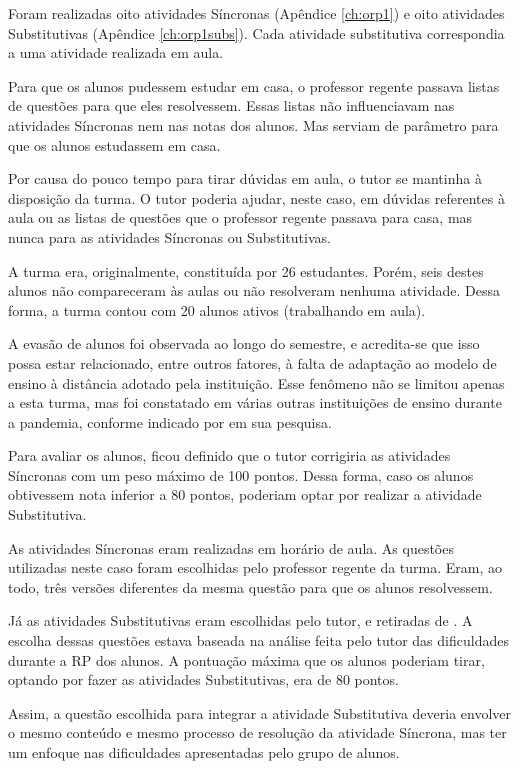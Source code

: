 Foram realizadas oito atividades Síncronas (Apêndice \ref{ch:orp1}) e oito atividades Substitutivas (Apêndice \ref{ch:orp1subs}). Cada atividade substitutiva correspondia a uma atividade realizada em aula.

Para que os alunos pudessem estudar em casa, o professor regente passava listas de questões para que eles resolvessem. Essas listas não influenciavam nas atividades Síncronas nem nas notas dos alunos. Mas serviam de parâmetro para que os alunos estudassem em casa.

Por causa do pouco tempo para tirar dúvidas em aula, o tutor se mantinha à disposição da turma. O tutor poderia ajudar, neste caso, em dúvidas referentes à aula ou as listas de questões que o professor regente passava para casa, mas nunca para as atividades Síncronas ou Substitutivas.

A turma era, originalmente, constituída por 26 estudantes. Porém, seis destes alunos não compareceram às aulas ou não resolveram nenhuma atividade. Dessa forma, a turma contou com 20 alunos ativos (trabalhando em aula).

A evasão de alunos foi observada ao longo do semestre, e acredita-se que isso possa estar relacionado, entre outros fatores, à falta de adaptação ao modelo de ensino à distância adotado pela instituição. Esse fenômeno não se limitou apenas a esta turma, mas foi constatado em várias outras instituições de ensino durante a pandemia, conforme indicado por  em sua pesquisa. 

Para avaliar os alunos, ficou definido que o tutor corrigiria as atividades Síncronas com um peso máximo de 100 pontos. Dessa forma, caso os alunos obtivessem nota inferior a 80 pontos, poderiam optar por realizar a atividade Substitutiva.

As atividades Síncronas eram realizadas em horário de aula. As questões utilizadas neste caso foram escolhidas pelo professor regente da turma. Eram, ao todo, três versões diferentes da mesma questão para que os alunos resolvessem.

Já as atividades Substitutivas eram escolhidas pelo tutor, e retiradas de . A escolha dessas questões estava baseada na análise feita pelo tutor das dificuldades durante a RP dos alunos. A pontuação máxima que os alunos poderiam tirar, optando por fazer as atividades Substitutivas, era de 80 pontos.

Assim, a questão escolhida para integrar a atividade Substitutiva deveria envolver o mesmo conteúdo e mesmo processo de resolução da atividade Síncrona, mas ter um enfoque nas dificuldades apresentadas pelo grupo de alunos.

